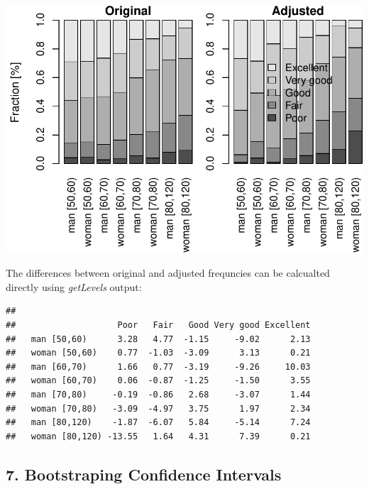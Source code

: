 \documentclass[]{article}
\newenvironment{Shaded}{\begin{snugshade}}{\end{snugshade}}
\newcommand{\DecValTok}[1]{\textcolor[rgb]{0.00,0.00,0.81}{#1}}
\newcommand{\KeywordTok}[1]{\textcolor[rgb]{0.13,0.29,0.53}{\textbf{#1}}}
\newcommand{\NormalTok}[1]{#1}
\newcommand{\OperatorTok}[1]{\textcolor[rgb]{0.81,0.36,0.00}{\textbf{#1}}}
\newcommand{\StringTok}[1]{\textcolor[rgb]{0.31,0.60,0.02}{#1}}
\begin{document}
\begin{center}\includegraphics{vignette_files/figure-latex/unnamed-chunk-20-1} \end{center}

The differences between original and adjusted frequncies can be
calcualted directly using \emph{getLevels} output:

\begin{Shaded}
\end{Shaded}

\begin{verbatim}
##                 
##                    Poor   Fair   Good Very good Excellent
##   man [50,60)      3.28   4.77  -1.15     -9.02      2.13
##   woman [50,60)    0.77  -1.03  -3.09      3.13      0.21
##   man [60,70)      1.66   0.77  -3.19     -9.26     10.03
##   woman [60,70)    0.06  -0.87  -1.25     -1.50      3.55
##   man [70,80)     -0.19  -0.86   2.68     -3.07      1.44
##   woman [70,80)   -3.09  -4.97   3.75      1.97      2.34
##   man [80,120)    -1.87  -6.07   5.84     -5.14      7.24
##   woman [80,120) -13.55   1.64   4.31      7.39      0.21
\end{verbatim}

\hypertarget{bootstraping-confidence-intervals}{%
\subsection{7. Bootstraping Confidence
Intervals}\label{bootstraping-confidence-intervals}}
\end{document}
